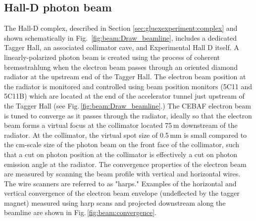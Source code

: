 \subsection{Hall-D photon beam \label{sec:gbeam}}
The Hall-D complex, described in Section \ref{sec:gluexexperiment:complex} and shown schematically in Fig.~\ref{fig:beam:Draw_beamline}, includes a dedicated Tagger Hall, an associated collimator cave, and Experimental Hall D itself. A linearly-polarized photon beam is created using the process of coherent bremsstrahlung \cite{timm1969,LIVINGSTON2009205} when the electron beam passes through an oriented diamond radiator at the upstream end of the Tagger Hall.
The electron beam position at the radiator is monitored and controlled using beam position monitors (5C11 and 5C11B) which are located at the end of the accelerator tunnel just upstream of the Tagger Hall (see Fig.\,\ref{fig:beam:Draw_beamline}.)
The CEBAF electron beam is tuned to converge as it passes through the radiator, ideally
so that the electron beam forms a virtual focus at the collimator 
located 75\,m downstream of the radiator.
At the collimator, the virtual spot size of 0.5\,mm is small compared to the cm-scale size of the photon beam on the front face of the collimator,
such that a cut on photon position at the collimator is effectively a cut on photon emission angle at the radiator. 
The convergence properties of the electron beam are measured by scanning the beam profile with vertical and horizontal wires. The wire scanners are referred to as "harps."
Examples of the horizontal and vertical convergence of the electron beam envelope (undeflected by the tagger magnet)
measured using harp scans and projected downstream along the beamline are shown in Fig.\,\ref{fig:beam:convergence}.


